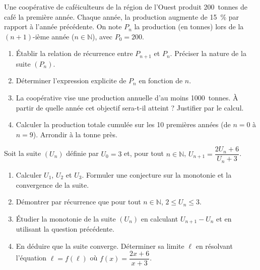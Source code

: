 \documentclass[11pt]{article}
\begin{document}
\begin{exercice}
Une coopérative de caféiculteurs de la région de l'Ouest produit \SI{200}{tonnes} de café la première année. Chaque année, la production augmente de \SI{15}{\%} par rapport à l'année précédente. On note $P_n$ la production (en tonnes) lors de la $(n+1)$-ième année ($n \in \mathbb{N}$), avec $P_0 = 200$.
\begin{enumerate}
    \item Établir la relation de récurrence entre $P_{n+1}$ et $P_n$. Préciser la nature de la suite $(P_n)$.
    \item Déterminer l'expression explicite de $P_n$ en fonction de $n$.
    \item La coopérative vise une production annuelle d'au moins \SI{1000}{tonnes}. À partir de quelle année cet objectif sera-t-il atteint ? Justifier par le calcul.
    \item Calculer la production totale cumulée sur les 10 premières années (de $n=0$ à $n=9$). Arrondir à la tonne près.
\end{enumerate}
\end{exercice}

\begin{exercice}
Soit la suite $(U_n)$ définie par $U_0 = 3$ et, pour tout $n \in \mathbb{N}$, $U_{n+1} = \dfrac{2U_n + 6}{U_n + 3}$.
\begin{enumerate}
    \item Calculer $U_1$, $U_2$ et $U_3$. Formuler une conjecture sur la monotonie et la convergence de la suite.
    \item Démontrer par récurrence que pour tout $n \in \mathbb{N}$, $2 \le U_n \le 3$.
    \item Étudier la monotonie de la suite $(U_n)$ en calculant $U_{n+1} - U_n$ et en utilisant la question précédente.
    \item En déduire que la suite converge. Déterminer sa limite $\ell$ en résolvant l'équation $\ell = f(\ell)$ où $f(x) = \dfrac{2x+6}{x+3}$.
\end{enumerate}
\end{exercice}
\end{document}
